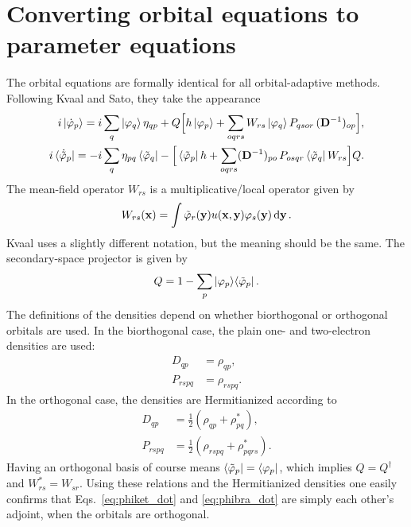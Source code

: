 \documentclass[aip,jcp,preprint,superscriptaddress,nofootinbib]{revtex4-1}
\begin{document}
\section{Converting orbital equations to parameter equations}
The orbital equations are formally identical for all orbital-adaptive methods.
Following Kvaal\cite{kvaalInitioQuantumDynamics2012} and Sato\cite{satoCommunicationTimedependentOptimized2018}, 
they take the appearance
\begin{subequations}
    \begin{align}
        i \ket{\dot{\varphi}_{p}} 
        = i \sum_{q} \ket{\varphi_{q}} \eta_{qp}
        + Q \Big[
        h \ket{\varphi_{p}} + \sum_{oqrs} W_{rs} \ket{\varphi_{q}} P_{qsor} \, (\mathbf{D}^{-1})_{op}
        \Big], \label{eq:phiket_dot} \\
        i \bra{\dot{\tilde{\varphi}}_{p}} 
        = -i \sum_{q} \eta_{pq} \bra{\tilde{\varphi}_{q}} -
        \Big[
        \bra{\tilde{\varphi}_{p}} h + \sum_{oqrs} (\mathbf{D}^{-1})_{po} \, P_{osqr}  \bra{\tilde{\varphi}_{q}} W_{rs} 
        \Big] Q. \label{eq:phibra_dot}
    \end{align}
\end{subequations}
The mean-field operator\cite{miyagiTimedependentRestrictedactivespaceSelfconsistentfield2013,satoTimedependentCompleteactivespaceSelfconsistentfield2013}
$W_{rs}$ is a multiplicative/local operator given by
\begin{align}
    W_{rs} (\mathbf{x}) = \int \tilde{\varphi}_{r} (\mathbf{y}) u(\mathbf{x}, \mathbf{y}) \varphi_{s} (\mathbf{y}) \dd{\mathbf{y}}.
\end{align}
Kvaal\cite{kvaalInitioQuantumDynamics2012} uses a slightly different notation, but the meaning should be the same. 
The secondary-space projector is given by
\begin{align}
    Q = 1 - \sum_{p} \ket{\varphi_{p}} \! \bra{\tilde{\varphi}_{p}}.
\end{align}
The definitions of the densities depend on whether biorthogonal\cite{kvaalInitioQuantumDynamics2012}
or orthogonal\cite{satoTimedependentCompleteactivespaceSelfconsistentfield2013} orbitals are used.
In the biorthogonal case, the plain one- and two-electron densities are used:
\begin{align}
    D_{qp}   &= \rho_{qp}, \\
    P_{rspq} &= \rho_{rspq}.
\end{align}
In the orthogonal case, the densities are Hermitianized according to
\begin{align}
    D_{qp}   &= \tfrac{1}{2} ( \rho_{qp}   + \rho_{pq}^*   ), \\
    P_{rspq} &= \tfrac{1}{2} ( \rho_{rspq} + \rho_{pqrs}^* ).
\end{align}
Having an orthogonal basis of course means $\bra{\tilde{\varphi}_{p}} = \bra{\varphi_{p}}$,
which implies $Q = Q^{\dagger}$ and $W_{rs}^* = W_{sr}$. Using these relations
and the Hermitianized densities one easily confirms that Eqs.~\eqref{eq:phiket_dot}
and \eqref{eq:phibra_dot} are simply each other's adjoint,
when the orbitals are orthogonal.
\end{document}
